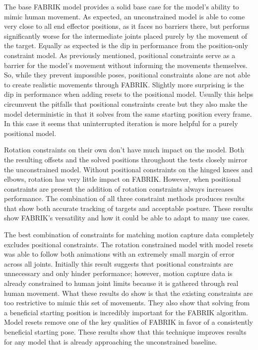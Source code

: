 \documentclass[10pt,twocolumn]{article}
\begin{document}
The base FABRIK model provides a solid base case for the model’s ability to mimic human movement. As expected, an unconstrained model is able to come very close to all end effector positions, as it faces no barriers there, but performs significantly worse for the intermediate joints placed purely by the movement of the target. Equally as expected is the dip in performance from the position-only constraint model. As previously mentioned, positional constraints serve as a barrier for the model’s movement without informing the movements themselves. So, while they prevent impossible poses, positional constraints alone are not able to create realistic movements through FABRIK. Slightly more surprising is the dip in performance when adding resets to the positional model. Usually this helps circumvent the pitfalls that positional constraints create but they also make the model deterministic in that it solves from the same starting position every frame. In this case it seems that uninterrupted iteration is more helpful for a purely positional model. 

Rotation constraints on their own don’t have much impact on the model. Both the resulting offsets and the solved positions throughout the tests closely mirror the unconstrained model. Without positional constraints on the hinged knees and elbows, rotation has very little impact on FABRIK. However, when positional constraints are present the addition of rotation constraints always increases performance. The combination of all three constraint methods produces results that show both accurate tracking of targets and acceptable posture. These results show FABRIK’s versatility and how it could be able to adapt to many use cases.

The best combination of constraints for matching motion capture data completely excludes positional constraints. The rotation constrained model with model resets was able to follow both animations with an extremely small margin of error across all joints. Initially this result suggests that positional constraints are unnecessary and only hinder performance; however, motion capture data is already constrained to human joint limits because it is gathered through real human movement. What these results do show is that the existing constraints are too restrictive to mimic this set of movements. They also show that solving from a beneficial starting position is incredibly important for the FABRIK algorithm. Model resets remove one of the key qualities of FABRIK in favor of a consistently beneficial starting pose. These results show that this technique improves results for any model that is already approaching the unconstrained baseline.
\end{document}
